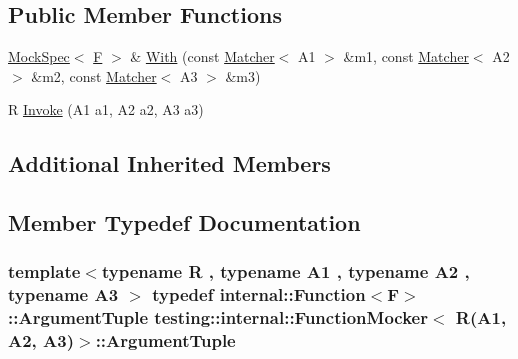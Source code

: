 \subsection*{Public Member Functions}
\begin{DoxyCompactItemize}
\item 
\hyperlink{classtesting_1_1internal_1_1MockSpec}{Mock\+Spec}$<$ \hyperlink{classtesting_1_1internal_1_1FunctionMocker_3_01R_07A1_00_01A2_00_01A3_08_4_a8c471830f963b8012785eb3eeca2cc9c}{F} $>$ \& \hyperlink{classtesting_1_1internal_1_1FunctionMocker_3_01R_07A1_00_01A2_00_01A3_08_4_a349af66650c6d0401dd1c0081773c25a}{With} (const \hyperlink{classtesting_1_1Matcher}{Matcher}$<$ A1 $>$ \&m1, const \hyperlink{classtesting_1_1Matcher}{Matcher}$<$ A2 $>$ \&m2, const \hyperlink{classtesting_1_1Matcher}{Matcher}$<$ A3 $>$ \&m3)
\item 
R \hyperlink{classtesting_1_1internal_1_1FunctionMocker_3_01R_07A1_00_01A2_00_01A3_08_4_a2afad9e39ca64acc6b178fa415907c5b}{Invoke} (A1 a1, A2 a2, A3 a3)
\end{DoxyCompactItemize}
\subsection*{Additional Inherited Members}


\subsection{Member Typedef Documentation}
\subsubsection[{\texorpdfstring{Argument\+Tuple}{ArgumentTuple}}]{\setlength{\rightskip}{0pt plus 5cm}template$<$typename R , typename A1 , typename A2 , typename A3 $>$ typedef {\bf internal\+::\+Function}$<${\bf F}$>$\+::{\bf Argument\+Tuple} {\bf testing\+::internal\+::\+Function\+Mocker}$<$ R(A1, A2, A3)$>$\+::{\bf Argument\+Tuple}}\hypertarget{classtesting_1_1internal_1_1FunctionMocker_3_01R_07A1_00_01A2_00_01A3_08_4_a347dcf4c054a5f1fbd0e2f0ad1c5e2f3}{}\label{classtesting_1_1internal_1_1FunctionMocker_3_01R_07A1_00_01A2_00_01A3_08_4_a347dcf4c054a5f1fbd0e2f0ad1c5e2f3}
